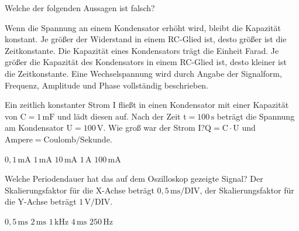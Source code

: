 \documentclass[11pt]{exam}
\begin{document}
\setlength{\voffset}{-0.5in}
\setlength{\headsep}{5pt}

\hspace{2mm}
 \hspace{5mm}
\vspace{4mm}

\begin{questions}

\question Welche der folgenden Aussagen ist falsch?

\begin{choices}
	\choice Wenn die Spannung an einem Kondensator erhöht wird, bleibt die Kapazität konstant.
	\choice Je größer der Widerstand in einem RC-Glied ist, desto größer ist die Zeitkonstante.
	\choice Die Kapazität eines Kondensators trägt die Einheit Farad.
	\choice Je größer die Kapazität des Kondensators in einem RC-Glied ist, desto kleiner ist die Zeitkonstante.
	\choice Eine Wechselspannung wird durch Angabe der Signalform, Frequenz, Amplitude und Phase vollständig beschrieben.
\end{choices}

\vspace{3mm}\question Ein zeitlich konstanter Strom \(\mathrm{I}\) fließt in einen Kondensator mit einer Kapazität von \(\mathrm{C=1\,mF}\) und lädt diesen auf. Nach der Zeit \(\mathrm{t=100\,s}\) beträgt die Spannung am Kondensator \(\mathrm{U=100\,V}\). Wie groß war der Strom \(\mathrm{I}\)?\(\mathrm{Q=C \cdot U}\) und \(\mathrm{Ampere=Coulomb/Sekunde}\).

\begin{choices}
	\choice \(\mathrm{0,1\,mA}\)
	\choice \(\mathrm{1\,mA}\)
	\choice \(\mathrm{10\,mA}\)
	\choice \(\mathrm{1\,A}\)
	\choice \(\mathrm{100\,mA}\)
\end{choices}

\vspace{3mm}\question Welche Periodendauer hat das auf dem Oszilloskop gezeigte Signal? Der Skalierungsfaktor für die X-Achse beträgt \(\mathrm{0,5\,ms/DIV}\), der Skalierungsfaktor für die Y-Achse beträgt \(\mathrm{1\,V/DIV}\).

\begin{choices}
	\choice \(\mathrm{0,5\,ms}\)
	\choice \(\mathrm{2\,ms}\)
	\choice \(\mathrm{1\,kHz}\)
	\choice \(\mathrm{4\,ms}\)
	\choice \(\mathrm{250\,Hz}\)
\end{choices}


\end{questions}
\end{document}
